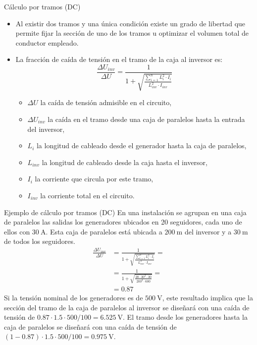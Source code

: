 \documentclass[aspectratio=169, usenames,svgnames,dvipsnames]{beamer}
\begin{document}
\begin{frame}[label={sec:org9b5c4ad}]{Cálculo por tramos (DC)}
\begin{itemize}
\item Al existir dos tramos y una única condición existe un grado de libertad que permite fijar la sección de uno de los tramos u optimizar el volumen total de conductor empleado.

\item La fracción de caída de tensión en el tramo de la caja al inversor es:  
\begin{equation*}
  \frac{\Delta U_{inv}}{\Delta U}= \frac{1}{1+\sqrt{\frac{\sum_{i=1}^nL_{i}^2
        \cdot I_{i}}{L_{inv}^2 \cdot I_{inv}}}}
\end{equation*}

\begin{itemize}
\item \(\Delta U\) la caída de tensión admisible en el circuito,

\item \(\Delta U_{inv}\) la caída en el tramo desde una caja de paralelos hasta la entrada del inversor,

\item \(L_i\) la longitud de cableado desde el generador hasta la caja de paralelos,
\item \(L_{inv}\) la longitud de cableado desde la caja hasta el inversor,

\item \(I_i\) la corriente que circula por este tramo,

\item \(I_{inv}\) la corriente total en el circuito.
\end{itemize}
\end{itemize}
\end{frame}

\begin{frame}[label={sec:org788e761}]{Ejemplo de cálculo por tramos (DC)}
En una instalación se agrupan en una caja de paralelos las salidas los generadores ubicados en 20 seguidores, cada uno de ellos con \(\qty{30}{\ampere}\). Esta caja de paralelos está ubicada a \(\qty{200}{\meter}\) del inversor y a \(\qty{30}{\meter}\) de todos los seguidores.
\begin{align*}
  \frac{\Delta U_{inv}}{\Delta U} &= \frac{1}{1+\sqrt{\frac{\sum_{i=1}^nL_{i}^2
                                    \cdot I_{i}}{L_{inv}^2 \cdot I_{inv}}}} = \\
                                  &=\frac{1}{1 + \sqrt{\frac{20 \cdot 30^2 \cdot 30}{200^2 \cdot 600 }}} = \\
                                  &= \num{0.87}
\end{align*}
Si la tensión nominal de los generadores es de \(\qty{500}{\volt}\), este resultado implica que la sección del tramo de la caja de paralelos al inversor se diseñará con una caída de tensión de \(\num{0.87} \cdot \num{1.5} \cdot 500 /100 = \qty{6.525}{\volt}\). El tramo desde los generadores hasta la caja de paralelos se diseñará con una caída de tensión de \((1 - \num{0.87}) \cdot \num{1.5} \cdot 500 /100 = \qty{0.975}{\volt}\).
\end{frame}
\end{document}
